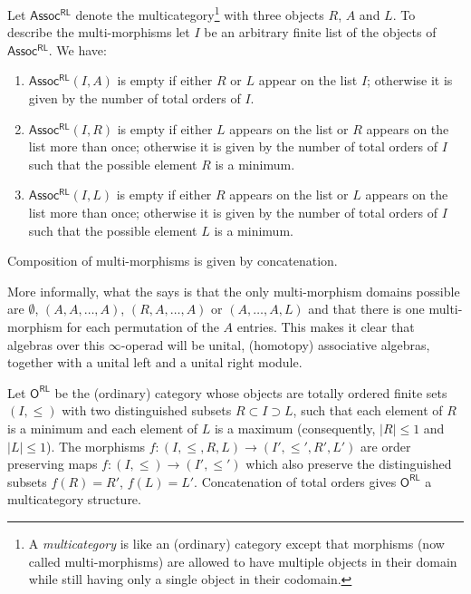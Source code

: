 \documentclass[../text]{subfiles}
\begin{document}
\begin{construction}\label{con:assocRL}
    Let $\mathsf{Assoc^{RL}}$ denote the multicategory\footnote{A \emph{multicategory} is like an (ordinary) category except that morphisms (now called multi-morphisms) are allowed to have multiple objects in their domain while still having only a single object in their codomain.} with three objects $R$, $A$ and $L$. To describe the multi-morphisms let $I$ be an arbitrary finite list of the objects of $\mathsf{Assoc^{RL}}$. We have:
    \begin{enumerate}
        \item $\mathsf{Assoc^{RL}}(I, A)$ is empty if either $R$ or $L$ appear on the list $I$; otherwise it is given by the number of total orders of $I$.
        \item $\mathsf{Assoc^{RL}}(I, R)$ is empty if either $L$ appears on the list or $R$ appears on the list more than once; otherwise it is given by the number of total orders of $I$ such that the possible element $R$ is a minimum.
        \item $\mathsf{Assoc^{RL}}(I, L)$ is empty if either $R$ appears on the list or $L$ appears on the list more than once; otherwise it is given by the number of total orders of $I$ such that the possible element $L$ is a minimum.
    \end{enumerate}
    Composition of multi-morphisms is given by concatenation. 
\end{construction}

\begin{remark}
    More informally, what the  says is that the only multi-morphism domains possible are $\emptyset$, $(A,A,\dots,A)$, $(R,A,\dots,A)$ or $(A,\dots,A, L)$ and that there is one multi-morphism for each permutation of the $A$ entries. This makes it clear that algebras over this $\infty$-operad will be unital, (homotopy) associative algebras, together with a unital left and a unital right module.
\end{remark}

\begin{construction}
    Let $\mathsf{O^{RL}}$ be the (ordinary) category whose objects are totally ordered finite sets $(I, \leq)$ with two distinguished subsets $R \subset I \supset L$, such that each element of $R$ is a minimum and each element of $L$ is a maximum (consequently, $|R| \leq 1$ and $|L| \leq 1$). The morphisms $f:(I, \leq, R, L) \xrightarrow{} (I', \leq', R', L')$ are order preserving maps $f: (I,\leq) \xrightarrow{} (I', \leq')$ which also preserve the distinguished subsets $f(R) = R'$, $f(L) = L'$. Concatenation of total orders gives $\mathsf{O^{RL}}$ a multicategory structure.
\end{construction}
\end{document}
